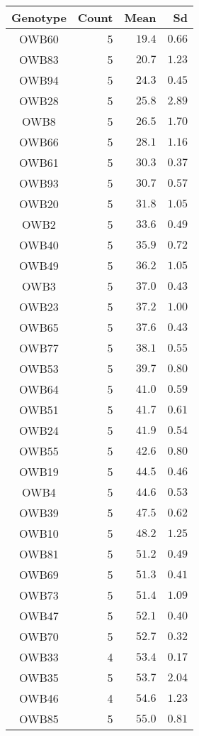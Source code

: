 \begin{longtable}{crrr}
\toprule
Genotype & Count & Mean & Sd \\ 
\midrule\addlinespace[2.5pt]
OWB60 & 5 & $19.4$ & $0.66$ \\ 
OWB83 & 5 & $20.7$ & $1.23$ \\ 
OWB94 & 5 & $24.3$ & $0.45$ \\ 
OWB28 & 5 & $25.8$ & $2.89$ \\ 
OWB8 & 5 & $26.5$ & $1.70$ \\ 
OWB66 & 5 & $28.1$ & $1.16$ \\ 
OWB61 & 5 & $30.3$ & $0.37$ \\ 
OWB93 & 5 & $30.7$ & $0.57$ \\ 
OWB20 & 5 & $31.8$ & $1.05$ \\ 
OWB2 & 5 & $33.6$ & $0.49$ \\ 
OWB40 & 5 & $35.9$ & $0.72$ \\ 
OWB49 & 5 & $36.2$ & $1.05$ \\ 
OWB3 & 5 & $37.0$ & $0.43$ \\ 
OWB23 & 5 & $37.2$ & $1.00$ \\ 
OWB65 & 5 & $37.6$ & $0.43$ \\ 
OWB77 & 5 & $38.1$ & $0.55$ \\ 
OWB53 & 5 & $39.7$ & $0.80$ \\ 
OWB64 & 5 & $41.0$ & $0.59$ \\ 
OWB51 & 5 & $41.7$ & $0.61$ \\ 
OWB24 & 5 & $41.9$ & $0.54$ \\ 
OWB55 & 5 & $42.6$ & $0.80$ \\ 
OWB19 & 5 & $44.5$ & $0.46$ \\ 
OWB4 & 5 & $44.6$ & $0.53$ \\ 
OWB39 & 5 & $47.5$ & $0.62$ \\ 
OWB10 & 5 & $48.2$ & $1.25$ \\ 
OWB81 & 5 & $51.2$ & $0.49$ \\ 
OWB69 & 5 & $51.3$ & $0.41$ \\ 
OWB73 & 5 & $51.4$ & $1.09$ \\ 
OWB47 & 5 & $52.1$ & $0.40$ \\ 
OWB70 & 5 & $52.7$ & $0.32$ \\ 
OWB33 & 4 & $53.4$ & $0.17$ \\ 
OWB35 & 5 & $53.7$ & $2.04$ \\ 
OWB46 & 4 & $54.6$ & $1.23$ \\ 
OWB85 & 5 & $55.0$ & $0.81$ \\ 

\end{longtable}

